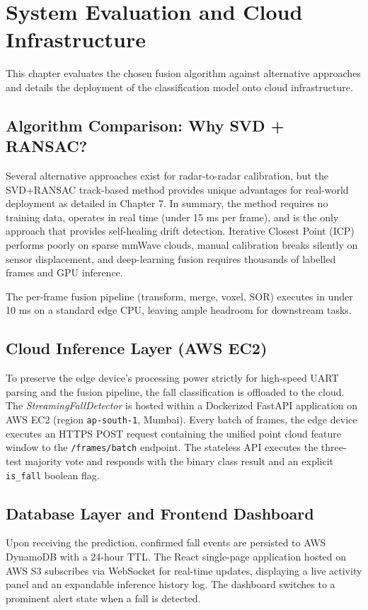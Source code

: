 \chapter{System Evaluation and Cloud Infrastructure}
This chapter evaluates the chosen fusion algorithm against alternative approaches and details the deployment of the classification model onto cloud infrastructure.

\section{Algorithm Comparison: Why SVD + RANSAC?}
Several alternative approaches exist for radar-to-radar calibration, but the SVD+RANSAC track-based method provides unique advantages for real-world deployment as detailed in Chapter 7. In summary, the method requires no training data, operates in real time (under 15 ms per frame), and is the only approach that provides self-healing drift detection. Iterative Closest Point (ICP) performs poorly on sparse mmWave clouds, manual calibration breaks silently on sensor displacement, and deep-learning fusion requires thousands of labelled frames and GPU inference.

The per-frame fusion pipeline (transform, merge, voxel, SOR) executes in under 10 ms on a standard edge CPU, leaving ample headroom for downstream tasks.

\section{Cloud Inference Layer (AWS EC2)}
To preserve the edge device's processing power strictly for high-speed UART parsing and the fusion pipeline, the fall classification is offloaded to the cloud. The \textit{StreamingFallDetector} is hosted within a Dockerized FastAPI application on AWS EC2 (region \texttt{ap-south-1}, Mumbai). Every batch of frames, the edge device executes an HTTPS POST request containing the unified point cloud feature window to the \texttt{/frames/batch} endpoint. The stateless API executes the three-test majority vote and responds with the binary class result and an explicit \texttt{is\_fall} boolean flag.

\section{Database Layer and Frontend Dashboard}
Upon receiving the prediction, confirmed fall events are persisted to AWS DynamoDB with a 24-hour TTL. The React single-page application hosted on AWS S3 subscribes via WebSocket for real-time updates, displaying a live activity panel and an expandable inference history log. The dashboard switches to a prominent alert state when a fall is detected.

